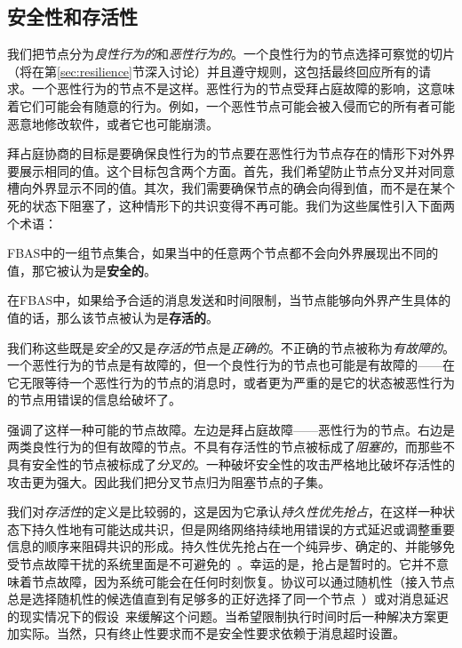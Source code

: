 \subsection{安全性和存活性}\label{sec:fba-safe-live}

我们把节点分为\textit{良性行为的}和\textit{恶性行为的}。一个良性行为的节点选择可察觉的{\quorum}切片（将在第\ref{sec:resilience}节深入讨论）并且遵守规则，这包括最终回应所有的请求。一个恶性行为的节点不是这样。恶性行为的节点受拜占庭故障的影响，这意味着它们可能会有随意的行为。例如，一个恶性节点可能会被入侵而它的所有者可能恶意地修改软件，或者它也可能崩溃。

拜占庭协商的目标是要确保良性行为的节点要在恶性行为节点存在的情形下对外界要展示相同的值。这个目标包含两个方面。首先，我们希望防止节点分叉并对同意槽向外界显示不同的值。其次，我们需要确保节点的确会向得到值，而不是在某个死的状态下阻塞了，这种情形下的共识变得不再可能。我们为这些属性引入下面两个术语：

\begin{definition}[安全性]
	FBAS中的一组节点集合，如果当中的任意两个节点都不会向外界展现出不同的值，那它被认为是{\textbf{安全的}}。
\end{definition}

\begin{definition}[存活性]
	在FBAS中，如果给予合适的消息发送和时间限制，当节点能够向外界产生具体的值的话，那么该节点被认为是{\textbf{存活的}}。
\end{definition}

我们称这些既是\textit{安全的}又是\textit{存活的}节点是\textit{正确的}。不正确的节点被称为{\textit{有故障的}}。一个恶性行为的节点是有故障的，但一个良性行为的节点也可能是有故障的——在它无限等待一个恶性行为的节点的消息时，或者更为严重的是它的状态被恶性行为的节点用错误的信息给破坏了。

强调了这样一种可能的节点故障。左边是拜占庭故障——恶性行为的节点。右边是两类良性行为的但有故障的节点。不具有存活性的节点被标成了\textit{阻塞的}，而那些不具有安全性的节点被标成了\textit{分叉的}。一种破坏安全性的攻击严格地比破坏存活性的攻击更为强大。因此我们把分叉节点归为阻塞节点的子集。

我们对\textit{存活性}的定义是比较弱的，这是因为它承认\textit{持久性优先抢占}，在这样一种状态下持久性地有可能达成共识，但是网络网络持续地用错误的方式延迟或调整重要信息的顺序来阻碍共识的形成。持久性优先抢占在一个纯异步、确定的、并能够免受节点故障干扰的系统里面是不可避免的~\cite{Fischer:1985:IDC:3149.214121}。幸运的是，抢占是暂时的。它并不意味着节点故障，因为系统可能会在任何时刻恢复。协议可以通过随机性（接入节点总是选择随机性的候选值直到有足够多的正好选择了同一个节点~\cite{Ben-Or:1983:AFC:800221.806707,Bracha:1985:ACB:4221.214134}）或对消息延迟的现实情况下的假设~\cite{Dwork:1988:CPP:42282.42283}来缓解这个问题。当希望限制执行时间时后一种解决方案更加实际。当然，只有终止性要求而不是安全性要求依赖于消息超时设置。


